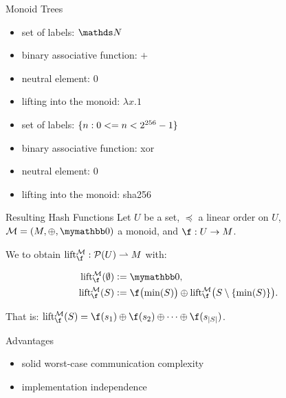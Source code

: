 \documentclass{beamer}
\begin{document}
\begin{frame}{Monoid Trees}
    \begin{itemize}
        \item set of labels: $\N$
        \item binary associative function: $+$
        \item neutral element: $0$\pause
        \item lifting into the monoid: $\lambda x.1$
    \end{itemize}

    \begin{itemize}
        \item<3-> set of labels: $\{n : 0 <= n < 2^{256} - 1\}$
        \item<4-> binary associative function: xor
        \item<4-> neutral element: $0$
        \item<3-> lifting into the monoid: sha256
    \end{itemize}
\end{frame}

\begin{frame}{Resulting Hash Functions}
    Let $U$ be a set, $\preceq$ a linear order on $U$, $\mathcal{M} = (M, \groupaddsym, \neutraladd)$ a monoid, and $\fun{\f}{U}{M}$.

    We  to obtain $\partialfun{\lift{\f}{\mathcal{M}}}{\powerset{U}}{M}$ with:

    \begin{align*}
    \lift{\f}{\mathcal{M}}(\emptyset) &\defeq \neutraladd,\\
    \lift{\f}{\mathcal{M}}(S) &\defeq \f\bigl(\min(S)\bigr) \oplus \lift{\f}{\mathcal{M}}\bigl(S \setminus \set{\min(S)}\bigr).\\
    \end{align*}

    That is: $\lift{\f}{\mathcal{M}}(S) = \groupadd{\f(s_1)}{\groupadd{\f(s_2)}{\groupadd{\cdots}{\f(s_{\abs{S}})}}}$.
\end{frame}

\begin{frame}{Advantages}
    \begin{itemize}
        \item solid worst-case communication complexity
        \item implementation independence
    \end{itemize}
\end{frame}
\end{document}
